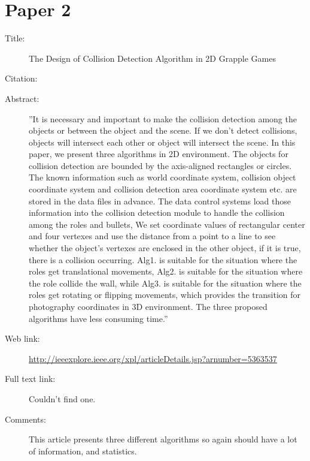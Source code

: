 \documentclass{scrartcl}
\begin{document}
\section*{Paper 2}
\begin{description}
	\item[Title:] 
	The Design of Collision Detection Algorithm in 2D Grapple Games
	\item[Citation:] \cite{Tan}
	\item[Abstract:] ''It is necessary and important to make the collision detection among the objects or between the object and the scene. If we don't detect collisions, objects will intersect each other or object will intersect the scene. In this paper, we present three algorithms in 2D environment. The objects for collision detection are bounded by the axis-aligned rectangles or circles. The known information such as world coordinate system, collision object coordinate system and collision detection area coordinate system etc. are stored in the data files in advance. The data control systems load those information into the collision detection module to handle the collision among the roles and bullets, We set coordinate values of rectangular center and four vertexes and use the distance from a point to a line to see whether the object's vertexes are enclosed in the other object, if it is true, there is a collision occurring. Alg1. is suitable for the situation where the roles get translational movements, Alg2. is suitable for the situation where the role collide the wall, while Alg3. is suitable for the situation where the roles get rotating or flipping movements, which provides the transition for photography coordinates in 3D environment. The three proposed algorithms have less consuming time.''
	\item[Web link:] \url{http://ieeexplore.ieee.org/xpl/articleDetails.jsp?arnumber=5363537}
	\item[Full text link:] Couldn't find one. 
	\item[Comments:] This article presents three different algorithms so again should have a lot of information, and statistics. 
\end{description}
\end{document}
